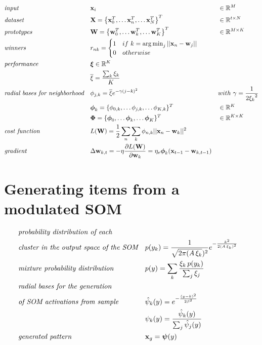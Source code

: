 \documentclass[a4paper]{article}
\DeclareMathOperator*{\argmin}{\operatorname*{arg\,min}} %
\begin{document}
\begin{align}
	&\emph{input} && \mathbf{x}_i &&\in\mathbb{R}^M \nonumber\\
	&\emph{dataset} && \mathbf{X}=\left\{\mathbf{x}^T_0,\dots\mathbf{x}^T_n,\dots\mathbf{x}^T_N\right\}^T &&\in\mathbb{R}^{t\times N} \nonumber\\
	&\emph{prototypes} && \mathbf{W}=\left\{\mathbf{w}^T_0,\dots\mathbf{w}^T_k,\dots\mathbf{w}^T_K\right\}^T &&\in\mathbb{R}^{M \times K} \nonumber\\
    &\emph{winners}&&  r_{nk} = 
   \begin{cases}
    1  & if\ k = \argmin_j ||\mathbf{x}_n - \mathbf{w}_j||\\
    0  & otherwise
  \end{cases} &&\nonumber\\
    &\emph{performance}&&\boldsymbol{\xi}\in\mathbb{R}^{K}&&\nonumber\\
    &&&\overline{\xi} = \frac{\sum_k \xi_k}{K}&&\nonumber\\
    &\emph{radial bases for neighborhood} && {\phi}_{j,k} = \overline{\xi} e^{{-\gamma (j-k)^2}}&& with\ \gamma=\frac{1}{2{\xi_k}^2}\nonumber\\
    &&& \boldsymbol{\phi}_k = \{\phi_{0,k}, \dots\phi_{j,k}, \dots \phi_{K,k}\}^T && \in\mathbb{R}^{K}\nonumber\\
    &&& \boldsymbol{\Phi} = \{\boldsymbol{\phi}_0, \dots\boldsymbol{\phi}_k, \dots \boldsymbol{\phi}_K\}^T && \in\mathbb{R}^{K\times K}\nonumber\\
    &\emph{cost function} && L(\mathbf{W}) = \frac{1}{2}\sum_n\sum_k \phi_{n,k}||\mathbf{x}_n - \mathbf{w}_k||^2  &&\nonumber\\
    &\emph{gradient}&& \Delta{\mathbf{w}_{k,t}} = -\eta\frac{\partial L(\mathbf{W})}{\partial\mathbf{w}_k} = \eta_e\boldsymbol{\phi}_{k}(\mathbf{x}_{t-1} - \mathbf{w}_{k, t-1}) &&\nonumber
\end{align}

\section*{Generating items from a modulated SOM}
\begin{align}
	&\emph{probability distribution of each}&& &&\nonumber\\
    &\emph{cluster in the output space of the SOM} && p(y_k) = \frac{1}{\sqrt{2\pi(A\,\xi_k})^2} e^{-\frac{k^2}{2(A\,\xi_k)^2}}\nonumber\\
    &\emph{mixture probability distribution} && p(y) = \sum_k \frac{\xi_k\,p(y_k)}{\sum_j\xi_j}\nonumber\\
    &\emph{radial bases for the generation}&&\nonumber\\ 
    &\emph{of SOM activations from sample} &&\hat{\psi}_k(y) = e^{-\frac{(y-k)^2}{2\beta^2}}\nonumber\\
    & &&\psi_k(y) = \frac{\hat{\psi}_k(y)}{\sum_j{\hat{\psi}_j(y)}} \nonumber\\
    &\emph{generated pattern}&&\mathbf{x}_g = \boldsymbol{\psi}(y)\nonumber     
\end{align}
\end{document}
